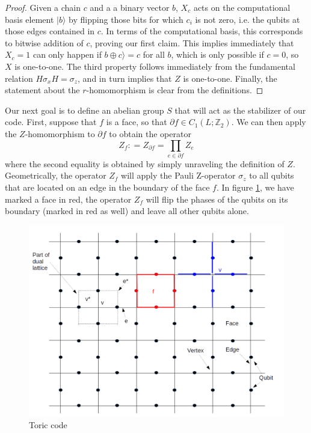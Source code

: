 \documentclass[a4paper, draft]{article}
\theoremstyle{own}
\theoremstyle{remark}
\newcommand{\Z}{\mathbb{Z}}
\begin{document}
\begin{proof}
Given a chain $c$ and a a binary vector $b$, $X_c$ acts on the computational basis element $|b \rangle$ by flipping those bits for which $c_i$ is not zero, i.e. the qubits at those edges contained in $c$. In terms of the computational basis, this corresponds to bitwise addition of $c$, proving our first claim. This implies immediately that $X_c = 1$ can only happen if $b \oplus c \rangle  = c$ for all $b$, which is only possible if $c=0$, so $X$ is one-to-one. The third property follows immediately from the fundamental relation $H \sigma_x H = \sigma_z$, and in turn implies that $Z$ is one-to-one. Finally, the statement about the $r$-homomorphism is clear from the definitions.
\end{proof}

Our next goal is to define an abelian group $S$ that will act as the stabilizer of our code. First, suppose that $f$ is a face, so that $\partial f \in C_1(L;\Z_2)$. We can then apply the $Z$-homomorphism to $\partial f$ to obtain the operator 
$$
Z_f \colon = Z_{\partial f} = \prod_{e \in \partial f} Z_e
$$
where the second equality is obtained by simply unraveling the definition of $Z$. Geometrically, the operator $Z_f$ will apply the Pauli Z-operator $\sigma_z$ to all qubits that are located on an edge in the boundary of the face $f$. In figure \ref{fig:ToricCode}, we have marked a face in red, the operator $Z_f$ will flip the phases of the qubits on its boundary (marked in red as well) and leave all other qubits alone.



\begin{figure}[ht]
\centering
\includegraphics[width=0.7\linewidth]{images/ToricCode}
\caption[Toric code]{Toric code}
\label{fig:ToricCode}
\end{figure}
\end{document}
